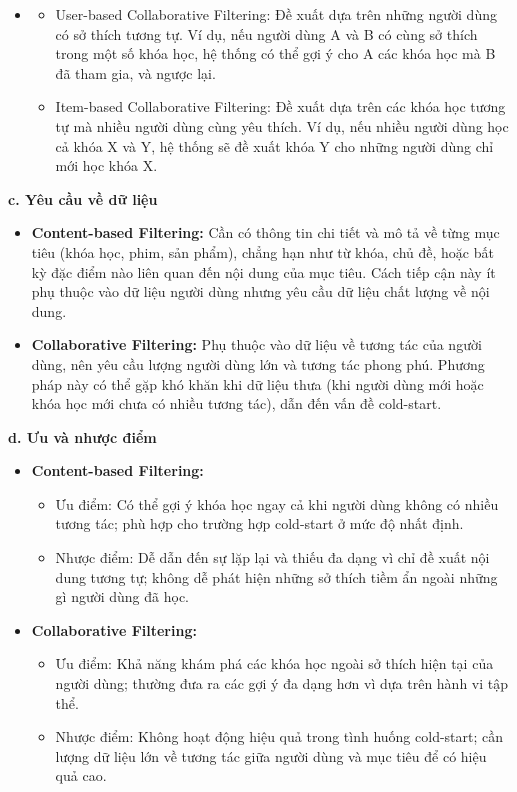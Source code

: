 \begin{itemize}
    \item
    \begin{itemize}
        \item User-based Collaborative Filtering: Đề xuất dựa trên những người dùng có sở thích tương tự. Ví dụ, nếu người dùng A và B có cùng sở thích trong một số khóa học, hệ thống có thể gợi ý cho A các khóa học mà B đã tham gia, và ngược lại.
        \item Item-based Collaborative Filtering: Đề xuất dựa trên các khóa học tương tự mà nhiều người dùng cùng yêu thích. Ví dụ, nếu nhiều người dùng học cả khóa X và Y, hệ thống sẽ đề xuất khóa Y cho những người dùng chỉ mới học khóa X.
    \end{itemize}
\end{itemize}
\textbf{c. Yêu cầu về dữ liệu}
\begin{itemize}
    \item \textbf{Content-based Filtering:} Cần có thông tin chi tiết và mô tả về từng mục tiêu (khóa học, phim, sản phẩm), chẳng hạn như từ khóa, chủ đề, hoặc bất kỳ đặc điểm nào liên quan đến nội dung của mục tiêu. Cách tiếp cận này ít phụ thuộc vào dữ liệu người dùng nhưng yêu cầu dữ liệu chất lượng về nội dung.
    \item \textbf{Collaborative Filtering:} Phụ thuộc vào dữ liệu về tương tác của người dùng, nên yêu cầu lượng người dùng lớn và tương tác phong phú. Phương pháp này có thể gặp khó khăn khi dữ liệu thưa (khi người dùng mới hoặc khóa học mới chưa có nhiều tương tác), dẫn đến vấn đề cold-start.
\end{itemize}
\textbf{d. Ưu và nhược điểm}
\begin{itemize}
    \item \textbf{Content-based Filtering:}
    \begin{itemize}
        \item Ưu điểm: Có thể gợi ý khóa học ngay cả khi người dùng không có nhiều tương tác; phù hợp cho trường hợp cold-start ở mức độ nhất định.
        \item Nhược điểm: Dễ dẫn đến sự lặp lại và thiếu đa dạng vì chỉ đề xuất nội dung tương tự; không dễ phát hiện những sở thích tiềm ẩn ngoài những gì người dùng đã học.
    \end{itemize}
    \item \textbf{Collaborative Filtering:}
    \begin{itemize}
        \item Ưu điểm: Khả năng khám phá các khóa học ngoài sở thích hiện tại của người dùng; thường đưa ra các gợi ý đa dạng hơn vì dựa trên hành vi tập thể.
        \item Nhược điểm: Không hoạt động hiệu quả trong tình huống cold-start; cần lượng dữ liệu lớn về tương tác giữa người dùng và mục tiêu để có hiệu quả cao.
    \end{itemize}
\end{itemize}
